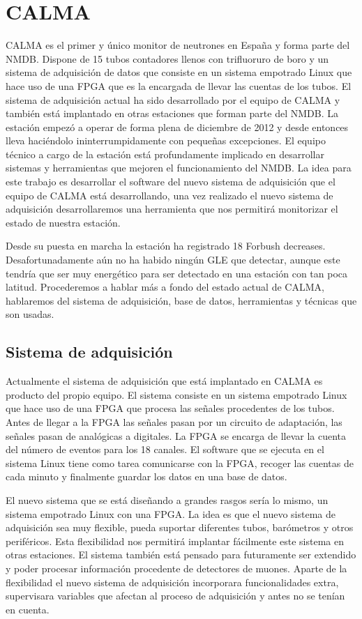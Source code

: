 \section{CALMA}
	CALMA\cite{Medina2013} es el primer y único monitor de neutrones en España y forma parte del NMDB. Dispone de 15 tubos contadores llenos con
	trifluoruro de boro y un sistema de adquisición de datos que consiste en un sistema empotrado Linux que hace uso de una FPGA que es la
	encargada de llevar las cuentas de los tubos. El sistema de adquisición actual ha sido desarrollado por el equipo de CALMA y también está
	implantado en otras estaciones que forman parte del NMDB. La estación empezó a operar de forma plena de diciembre de 2012 y desde entonces
	lleva haciéndolo ininterrumpidamente con pequeñas excepciones. El equipo técnico a cargo de la estación está profundamente implicado en
	desarrollar sistemas y herramientas que mejoren el funcionamiento del NMDB. La idea para este trabajo es desarrollar el software del nuevo
	sistema de adquisición que el equipo de CALMA está desarrollando, una vez realizado el nuevo sistema de adquisición desarrollaremos una
	herramienta que nos permitirá monitorizar el estado de nuestra estación.
	\par
	Desde su puesta en marcha la estación ha registrado 18 Forbush decreases. Desafortunadamente aún no ha habido ningún GLE que detectar, aunque
	este tendría que ser muy energético para ser detectado en una estación con tan poca latitud.  Procederemos a hablar más a fondo del estado
	actual de CALMA, hablaremos del sistema de adquisición, base de datos, herramientas y técnicas que son usadas.
	\subsection{Sistema de adquisición}
		Actualmente el sistema de adquisición que está implantado en CALMA es producto del propio equipo\cite{Garcia2014}. El sistema consiste
		en un sistema empotrado Linux que hace uso de una FPGA que procesa las señales procedentes de los tubos. Antes de llegar a la FPGA las
		señales pasan por un circuito de adaptación, las señales pasan de analógicas a digitales. La FPGA se encarga de llevar la cuenta del
		número de eventos para los 18 canales. El software que se ejecuta en el sistema Linux tiene como tarea comunicarse con la FPGA,
		recoger las cuentas de cada minuto y finalmente guardar los datos en una base de datos.  
		\par 
		El nuevo sistema que se está diseñando a grandes rasgos sería lo mismo, un sistema empotrado Linux con una FPGA. La idea es que el
		nuevo sistema de adquisición sea muy flexible, pueda suportar diferentes tubos, barómetros y otros periféricos. Esta flexibilidad nos
		permitirá implantar fácilmente este sistema en otras estaciones. El sistema también está pensado para futuramente ser extendido y
		poder procesar información procedente de detectores de muones. Aparte de la flexibilidad el nuevo sistema de adquisición incorporara
		funcionalidades extra, supervisara variables que afectan al proceso de adquisición y antes no se tenían en cuenta.
